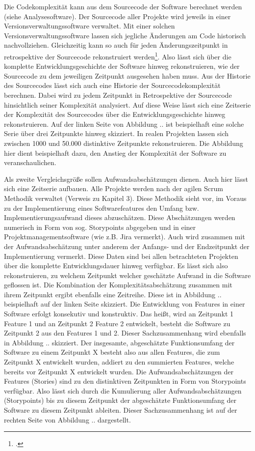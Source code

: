 Die Codekomplexität kann aus dem Sourcecode der Software berechnet
werden (siehe Analysesoftware). Der Sourcecode aller Projekte wird
jeweils in einer Versionsverwaltungssoftware verwaltet. Mit einer
solchen Versionsverwaltungssoftware lassen sich jegliche Änderungen am
Code historisch nachvollziehen. Gleichzeitig kann so auch für jeden
Änderungszeitpunkt in retrospektive der Sourcecode rekonstruiert
werden\footcite[Vgl. ][]{Quelle Git}. Also lässt sich über die komplette
Entwicklungsgeschichte der Software hinweg rekonstruieren, wie der
Sourcecode zu dem jeweiligen Zeitpunkt ausgesehen haben muss. Aus der
Historie des Sourcecodes lässt sich auch eine Historie der
Sourcecodekomplexität berechnen. Dabei wird zu jedem Zeitpunkt in
Retrospektive der Sourcecode hinsichtlich seiner Komplexität analysiert.
Auf diese Weise lässt sich eine Zeitserie der Komplexität des
Sourcecodes über die Entwicklungsgeschichte hinweg rekonstruieren. Auf
der linken Seite von Abbildung .. ist beispielhaft eine solche Serie
über drei Zeitpunkte hinweg skizziert. In realen Projekten lassen sich
zwischen 1000 und 50.000 distinktive Zeitpunkte rekonstruieren. Die
Abbildung hier dient beispielhaft dazu, den Anstieg der Komplexität der
Software zu veranschaulichen.

Als zweite Vergleichsgröße sollen Aufwandsabschätzungen dienen. Auch
hier lässt sich eine Zeitserie aufbauen. Alle Projekte werden nach der
agilen Scrum Methodik verwaltet (Verweis zu Kapitel 3). Diese Methodik
sieht vor, im Voraus zu der Implementierung eines Softwarefeatures den
Umfang bzw. Implementierungsaufwand dieses abzuschätzen. Diese
Abschätzungen werden numerisch in Form von sog. Storypoints abgegeben
und in einer Projektmanagementsoftware (wie z.B. Jira vermerkt). Auch
wird zusammen mit der Aufwandsabschätzung unter anderem der Anfangs- und
der Endzeitpunkt der Implementierung vermerkt. Diese Daten sind bei
allen betrachteten Projekten über die komplette Entwicklungsdauer hinweg
verfügbar. Es lässt sich also rekonstruieren, zu welchem Zeitpunkt
welcher geschätzte Aufwand in die Software geflossen ist. Die
Kombination der Komplexitätsabschätzung zusammen mit ihrem Zeitpunkt
ergibt ebenfalls eine Zeitreihe. Diese ist in Abbildung .. beispielhaft
auf der linken Seite skizziert. Die Entwicklung von Features in einer
Software erfolgt konsekutiv und konstruktiv. Das heißt, wird an
Zeitpunkt 1 Feature 1 und an Zeitpunkt 2 Feature 2 entwickelt, besteht
die Software zu Zeitpunkt 2 aus den Features 1 und 2. Dieser
Sachzusammenhang wird ebenfalls in Abbildung .. skizziert. Der
insgesamte, abgeschätzte Funktionsumfang der Software zu einem Zeitpunkt
X besteht also aus allen Features, die zum Zeitpunkt X entwickelt
wurden, addiert zu den summierten Features, welche bereits vor Zeitpunkt
X entwickelt wurden. Die Aufwandsabschätzungen der Features (Stories)
sind zu den distinktiven Zeitpunkten in Form von Storypoints verfügbar.
Also lässt sich durch die Kumulierung aller Aufwandsabschätzungen
(Storypoints) bis zu diesem Zeitpunkt der abgeschätzte Funktionsumfang
der Software zu diesem Zeitpunkt ableiten. Dieser Sachzusammenhang ist
auf der rechten Seite von Abbildung .. dargestellt.

